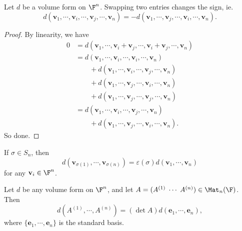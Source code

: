 \documentclass[a4paper]{article}
\begin{document}
\begin{lemma}
  Let $d$ be a volume form on $\F^n$. Swapping two entries changes the sign, ie.
  \[
    d (\mathbf{v}_1, \cdots, \mathbf{v}_i, \cdots, \mathbf{v}_j,\cdots, \mathbf{v}_n) = -d(\mathbf{v}_1, \cdots, \mathbf{v}_j, \cdots, \mathbf{v}_i, \cdots, \mathbf{v}_n).
  \]
\end{lemma}

\begin{proof}
  By linearity, we have
  \begin{align*}
    0 &= d(\mathbf{v}_1, \cdots, \mathbf{v}_i + \mathbf{v}_j, \cdots, \mathbf{v}_i + \mathbf{v}_j, \cdots,\mathbf{v}_n) \\
    &= d(\mathbf{v}_1, \cdots, \mathbf{v}_i, \cdots, \mathbf{v}_i, \cdots, \mathbf{v}_n)\\
    &\quad\quad+ d(\mathbf{v}_1, \cdots, \mathbf{v}_i, \cdots, \mathbf{v}_j, \cdots, \mathbf{v}_n)\\
    &\quad\quad+ d(\mathbf{v}_1, \cdots, \mathbf{v}_j, \cdots, \mathbf{v}_i, \cdots, \mathbf{v}_n)\\
    &\quad\quad+ d(\mathbf{v}_1, \cdots, \mathbf{v}_j, \cdots, \mathbf{v}_j, \cdots, \mathbf{v}_n)\\
    &= d(\mathbf{v}_1, \cdots, \mathbf{v}_i, \cdots, \mathbf{v}_j, \cdots, \mathbf{v}_n)\\
    &\quad\quad+ d(\mathbf{v}_1, \cdots, \mathbf{v}_j, \cdots, \mathbf{v}_i, \cdots, \mathbf{v}_n).
  \end{align*}
  So done.
\end{proof}

\begin{cor}
  If $\sigma \in S_n$, then
  \[
    d(\mathbf{v}_{\sigma(1)}, \cdots, \mathbf{v}_{\sigma(n)}) = \varepsilon(\sigma) d(\mathbf{v}_1,\cdots, \mathbf{v}_n)
  \]
  for any $\mathbf{v}_i \in \F^n$.
\end{cor}

\begin{thm}[]
  Let $d$ be any volume form on $\F^n$, and let $A = (A^{(1)}\;\cdots \;A^{(n)}) \in \Mat_n(\F)$. Then
  \[
    d(A^{(1)}, \cdots, A^{(n)}) = (\det A) d(\mathbf{e}_1, \cdots, \mathbf{e}_n),
  \]
  where $\{\mathbf{e}_1, \cdots, \mathbf{e}_n\}$ is the standard basis.
\end{thm}
\end{document}
